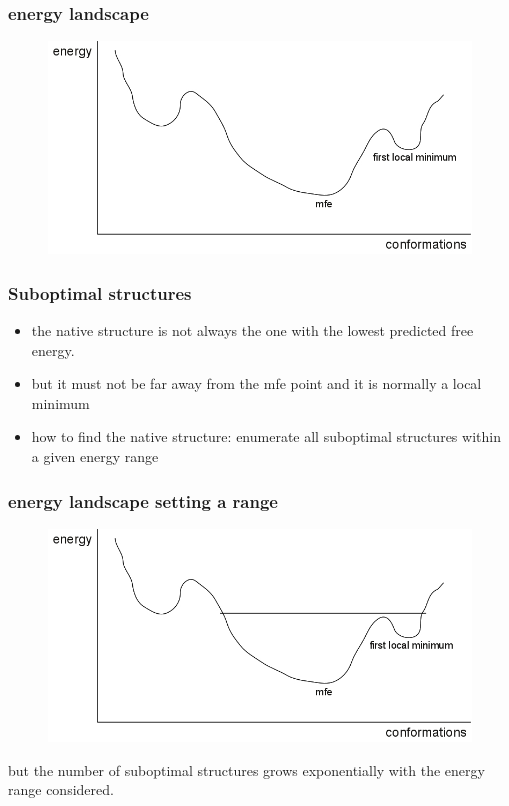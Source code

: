 \documentclass[ignorenonframetext,10pt]{beamer}
\begin{document}
\begin{frame}
\frametitle{energy landscape}
\begin{figure}
  \includegraphics[scale=0.4]{images/energy_landscape_simple.jpg}
\end{figure}
\end{frame}


\begin{frame}
\frametitle{Suboptimal structures}
  \begin{itemize} 
    \item the native structure is not always the one with the lowest predicted free energy.
    \item but it must not be far away from the mfe point and it is normally a local minimum
    \item how to find the native structure: enumerate all suboptimal structures within a given energy range
  \end{itemize}
\end{frame}


\begin{frame}
\frametitle{energy landscape setting a range}  
\begin{figure}
  \includegraphics[scale=0.4]{images/energy_landscape_area.jpg} 
\end{figure}
but the number of suboptimal structures grows exponentially with the energy range considered.
\end{frame}
\end{document}

